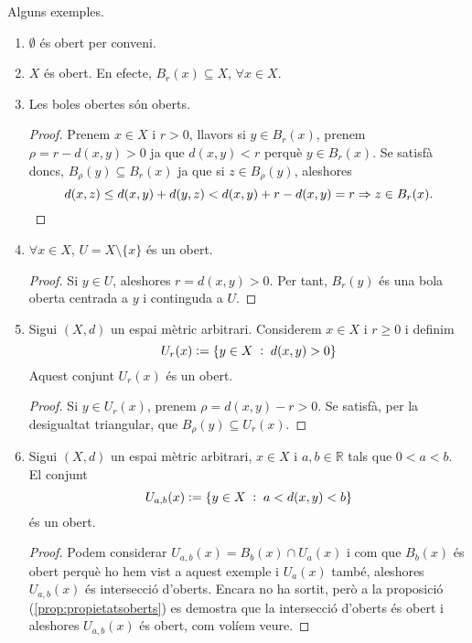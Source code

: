 \documentclass[../main.tex]{subfiles}
\begin{document}
\begin{ej}\label{ej:exemplesdoberts}
Alguns exemples.
\begin{enumerate}[(1)]
    \item $\emptyset$ és obert per conveni.
    \item $X$ és obert. En efecte, $B_r(x)\subseteq X$, $\forall x\in X$.
    \item Les boles obertes són oberts.
    \begin{proof}
    Prenem $x\in X$ i $r>0$, llavors si $y\in B_r(x)$, prenem $\rho = r-d(x,y) > 0$ ja que $d(x,y)< r$ perquè $y\in B_r(x)$. Se satisfà doncs, $B_\rho(y) \subseteq B_r(x)$ ja que si $z\in B_\rho(y)$, aleshores
    \begin{equation}
        \notag
        d(x,z)\leq d(x,y) + d(y,z) < d(x,y)+r-d(x,y) = r \Rightarrow z\in B_r(x).
    \end{equation}
    \end{proof}
    
    \item $\forall x\in X$, $U = X\setminus\{x\}$ és un obert.
    \begin{proof}
    Si $y\in U$, aleshores $r=d(x,y)>0$. Per tant, $B_r(y)$ és una bola oberta centrada a $y$ i continguda a $U$.
    \end{proof}
    
    \item Sigui $(X,d)$ un espai mètric arbitrari. Considerem $x\in X$ i $r\geq 0$ i definim
    \begin{equation}
        \notag
        U_r(x) := \{y\in X\;:\; d(x,y)>0\}
    \end{equation}
    Aquest conjunt $U_r(x)$ és un obert.
    \begin{proof}
    Si $y\in U_r(x)$, prenem $\rho = d(x,y)-r>0$. Se satisfà, per la desigualtat triangular, que $B_\rho(y)\subseteq U_r(x)$.
    \end{proof}
    
    \item Sigui $(X,d)$ un espai mètric arbitrari, $x\in X$ i $a,b\in \mathbb{R}$ tals que $0<a<b$. El conjunt
    \begin{equation}
        \notag
        U_{a,b}(x):=\{y\in X\;:\;a<d(x,y)<b\}
    \end{equation}
    és un obert.
    \begin{proof}
    Podem considerar $U_{a,b}(x) = B_b(x)\cap U_a(x)$ i com que $B_b(x)$ és obert perquè ho hem vist a aquest exemple i $U_a(x)$ també, aleshores $U_{a,b}(x)$ és intersecció d'oberts. Encara no ha sortit, però a la proposició (\ref{prop:propietatsoberts}) es demostra que la intersecció d'oberts és obert i aleshores $U_{a,b}(x)$ és obert, com volíem veure.
    \end{proof}
    

\end{enumerate}
\end{ej}
\end{document}
